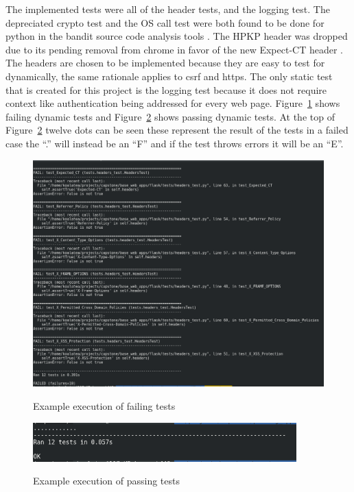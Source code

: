 The implemented tests were all of the header tests, and the logging test. The depreciated crypto test and the OS call test were both found to be done for python in the bandit source code analysis tools
\cite{bandit}. The HPKP header was dropped due to its pending removal from chrome in favor of the new Expect-CT header \cite{hpkp}. The headers are chosen to be implemented because they are easy to test for
dynamically, the same rationale applies to csrf and https. The only static test that is created for this project is the logging test because it does not require context like authentication being
addressed for every web page. Figure~\ref{fig:fig2} shows failing dynamic tests and Figure~\ref{fig:fig3} shows passing dynamic tests. At the top of Figure~\ref{fig:fig3} twelve dots can be seen these
represent the result of the tests in a failed case the ``.'' will instead be an ``F'' and if the test throws errors it will be an ``E''.
\begin{figure}[!ht]
  \centering
\includegraphics[width=5in]{unittestfail}
\caption{\label{fig:fig2}}Example execution of failing tests
\end{figure}
\begin{figure}[!ht]
  \centering
\includegraphics[width=4in]{unittestpass}
\caption{\label{fig:fig3}}Example execution of passing tests
\end{figure}


